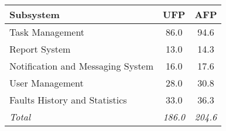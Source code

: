 
\begin{tabular}{l|c|c}
\textbf{Subsystem} & \textbf{UFP} & \textbf{AFP} \\ \hline
Task Management	& 86.0 & 94.6 \\
Report System & 13.0 & 14.3 \\
Notification and Messaging System & 16.0 & 17.6 \\
User Management & 28.0 & 30.8 \\
Faults History and Statistics & 33.0 & 36.3 \\ \hline
\textit{Total} & \textit{186.0} & \textit{204.6}
\end{tabular}